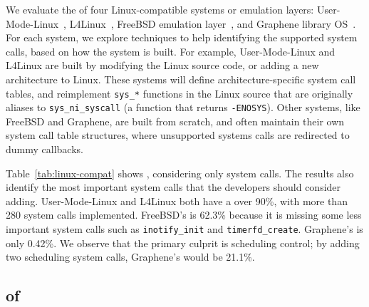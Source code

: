 We evaluate the \compatmetric{} of four Linux-compatible systems or emulation layers:
User-Mode-Linux~\citep{user-mode-linux}, L4Linux~\citep{hartig97mu}, FreeBSD emulation layer~\citep{freebsd-emu}, and Graphene library OS~\citep{tsai14graphene}.
For each system, we explore techniques
to help identifying the supported system calls,
based on how the system is built.
For example, User-Mode-Linux and L4Linux
are built by modifying the Linux source code,
or adding a new architecture to Linux.
These systems will define architecture-specific system call tables,
and reimplement {\tt sys\_*} functions in the Linux source
that are originally aliases to {\tt sys\_ni\_syscall}
(a function that returns {\tt -ENOSYS}). 
Other systems, like FreeBSD and Graphene,
are built from scratch,
and often maintain their own system call table structures,
where unsupported systems calls
are redirected to dummy callbacks.


Table~\ref{tab:linux-compat} shows \compatmetric{},
considering only system calls.
The results also identify the most important system calls
that the developers should consider adding. 
User-Mode-Linux and L4Linux both have a \compatmetric{} over 90\%,
with more than 280 system calls implemented.
FreeBSD's  \compatmetric{} is  62.3\% because it is missing some less
important system calls
such as {\tt inotify\_init} and {\tt timerfd\_create}.
Graphene's \compatmetric{} is only 0.42\%.
We observe that the primary culprit is 
scheduling control; by adding two scheduling system calls,
Graphene's \compatmetric{} would be 21.1\%.

\subsection{\CompatMetric{} of \Libc{}}

